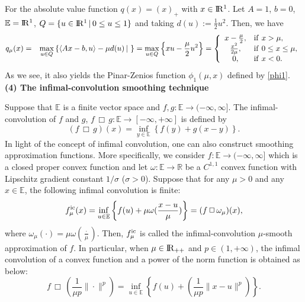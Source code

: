 \documentclass[12pt]{article}
\renewcommand{\Re}{{\rm I}\! {\rm R}}
\begin{document}
 For the absolute value function $q(x) = (x)_+ $ with $x\in \Re^1$. Let $A=1$,
 $b=0$, $\mathbb{E}=\Re^1$, $Q=\{u\in \Re^1 \, | \, 0 \leq u \leq 1\}$ and taking
 $d(u):=\frac{1}{2}u^2$. Then, we have
 \begin{eqnarray*}
 q_\mu(x)
    &=& \max_{u \in Q} \left\{ \langle Ax-b,u \rangle - \mu d(u)\, | \ \right \}
    = \max_{u \in Q} \left\{ xu - \frac{\mu}{2}u^2 \right \}
    = \left\{
 \begin{array}{cl}
    x -\frac{\mu}{2}, &  {\rm if} \  x > \mu, \\
    \frac{x^2}{2\mu},  & {\rm if} \ 0 \leq x \leq \mu, \\
    0,                 &  {\rm if} \  x < 0. \\
  \end{array}
    \right.
 \end{eqnarray*}
 As we see, it also yields the Pinar-Zenios function \cite{PZ1995} $\phi_1(\mu, x)$ defined
 by \eqref{phi1}.
 \\



 \noindent
 {\bf (4) The infimal-convolution smoothing technique}

 \medskip

 Suppose that $\mathbb{E}$ is a finite vector space and
 $f, g:\mathbb{E} \to (-\infty,\infty]$. The infimal-convolution of $f$ and $g$,
 $f \, \Box \, g : \mathbb{E} \to [-\infty, +\infty]$ is defined by
 \[
 (f \, \Box \, g)(x) = \inf_{y \in \mathbb{E}} \left \{ f(y)+g(x-y) \right \}.
 \]
 In light of the concept of infimal convolution, one can also construct smoothing
 approximation functions. More specifically, we consider
 $f : \mathbb{E} \to (-\infty,\infty]$ which is a closed proper convex
 function and let $\omega : \mathbb{E} \to \mathbb{R} $ be a $C^{1,1}$
 convex function with Lipschitz gradient constant $1/\sigma$ ($\sigma> 0$).
 Suppose that for any $\mu >0$ and any $x \in \mathbb{E}$, the following
 infimal convolution is finite:
 \begin{equation*} \label{inf-cov}
 f^{\rm ic}_\mu(x)
 = \inf_{u\in \mathbb{E}} \left\{ f(u)+\mu \omega(\frac{x-u}{\mu}) \right \}
 = (f \, \Box \, \omega_\mu) (x),
 \end{equation*}
 where $\omega_\mu(\cdot)=\mu\omega(\frac{\cdot}{\mu})$.
 Then, $f^{\rm ic}_\mu$ is called the infimal-convolution $\mu$-smooth approximation
 of $f$. In particular, when $\mu\in \Re_{++}$ and $p\in (1,+\infty)$, the
 infimal convolution of a convex function and a power of the norm function is
 obtained as below:
 \begin{equation*}
 f \, \Box \, \left( \frac{1}{\mu p}\|\cdot\|^p \right)
 = \inf_{u\in \mathbb{E}} \left\{ f(u)+ (\frac{1}{\mu p}\|x-u\|^p) \right \}.
 \end{equation*}
\end{document}
